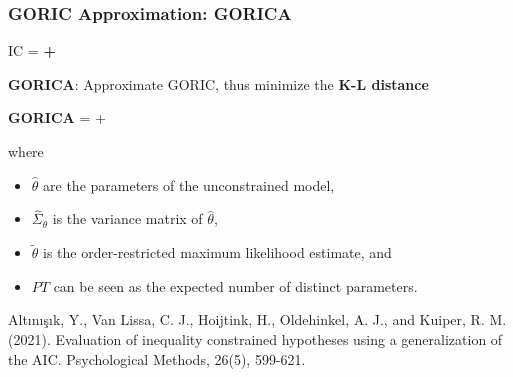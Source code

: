 \documentclass[10pt]{beamer}\usepackage[]{graphicx}\usepackage[]{xcolor}
\begin{document}
\begin{frame}
	\frametitle{GORIC Approximation: GORICA}
	
	\centerline{	IC = \textbf{{\color{orange}{model misfit}} + {\color{purple}{model complexity}}}}
	\vspace{.5 cm}
	
	{\textbf{GORICA}: Approximate GORIC, thus minimize the \textbf{K-L distance}}
	
	\vspace{0.5cm}
	\centerline{{\textbf{GORICA} ={} + \color{purple}{$2 PT$}}}
	
	\vspace{.5 cm}
	
	where 
	\begin{itemize}
			\item $\hat{\theta}$ are the parameters of the unconstrained model,
			\item $\hat{\Sigma}_{\theta}$ is the variance matrix of $\hat{\theta}$,
			\item $\tilde{\theta}$ is the order-restricted maximum likelihood estimate, and
			\item $PT$ can be seen as the expected number of distinct parameters. %
		\end{itemize}
		
\vspace{.5 cm}

	\footnotesize{
	Alt{\i}n{\i}\c{s}{\i}k, Y., Van Lissa, C. J., Hoijtink, H., Oldehinkel, A. J., and Kuiper, R. M. (2021). Evaluation of inequality constrained hypotheses using a generalization of the AIC. Psychological Methods, 26(5), 599-621. %
	}
	
\end{frame}
%
\end{document}
